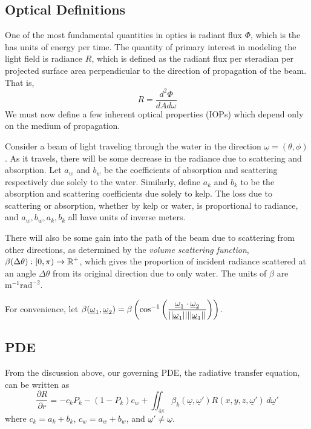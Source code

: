 \subsection{Optical Definitions}
One of the most fundamental quantities in optics is radiant flux $\Phi$, which is the has units of energy per time.
The quantity of primary interest in modeling the light field is radiance $R$, which is defined as the radiant flux per steradian per projected surface area perpendicular to the direction of propagation of the beam.
That is,
\begin{equation}
	R = \frac{d^2\Phi}{dA d\omega}
\end{equation}
We must now define a few inherent optical properties (IOPs) which depend only on the medium of propagation.

Consider a beam of light traveling through the water in the direction $\underline{\omega} = (\theta,\phi)$.
As it travels, there will be some decrease in the radiance due to scattering and absorption.
Let $a_w$ and $b_w$ be the coefficients of absorption and scattering respectively due solely to the water.
Similarly, define $a_k$ and $b_k$ to be the absorption and scattering coefficients due solely to kelp.
The loss due to scattering or absorption, whether by kelp or water, is proportional to radiance, and $a_w,b_w,a_k,b_k$ all have units of inverse meters.

There will also be some gain into the path of the beam due to scattering from other directions, as determined by the \textit{volume scattering function},
$\displaystyle \beta(\Delta\theta): [0,\pi) \rightarrow \mathbb{R}^+$, which gives the proportion of incident radiance scattered at an angle $\Delta\theta$ from its original direction due to only water.
The units of $\beta$ are $\mbox{m}^{-1}\mbox{rad}^{-2}$.

For convenience, let $\displaystyle \beta(\underline{\omega}_1,\underline{\omega}_2) = \beta\left(\cos^{-1}\left(\frac{\underline{\omega}_1\cdot\underline{\omega}_2}{||\underline{\omega}_1||||\underline{\omega}_1||}\right)\right)$. 

\subsection{PDE}
From the discussion above, our governing PDE, the radiative transfer equation, can be written as
\begin{equation}
	\frac{\partial R}{\partial r} = 
	- c_kP_k - (1-P_k)c_w
	+ \iint_{4\pi}
	\beta_k(\underline{\omega},\underline{\omega}')
	R(x,y,z,\underline{\omega}')\,d\underline{\omega}'
	\label{eqn:rte1}
\end{equation}
where $c_k = a_k + b_k$, $c_w = a_w + b_w$, and $\underline{\omega}' \neq \underline{\omega}$.

